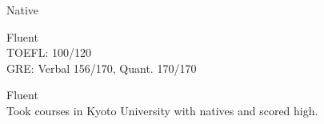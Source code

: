 \documentclass[10pt]{article} %
\begin{document}
{
Native
}

{
Fluent\\
TOEFL: 100/120\\
GRE: Verbal 156/170, Quant. 170/170
}

{
Fluent\\
Took courses in Kyoto University with natives and scored high.
}

%
%
%
%
%
%

%
%
\end{document}
